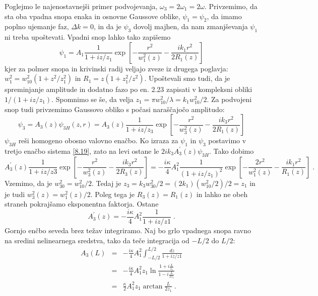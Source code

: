 \documentclass[11pt,fleqn]{book} %
\begin{document}
Poglejmo le najenostavnejši primer podvojevanja, $\omega_{3}=2\omega_{1}=2\omega$.
Privzemimo, da sta oba vpadna snopa enaka in osnovne Gaussove oblike,
$\psi_{1}=\psi_{2}$, da imamo poplno ujemanje faz, $\Delta k=0$,
in da je $\psi_{3}$ dovolj majhen, da nam zmanjševanja $\psi_{1}$
ni treba upoštevati. Vpadni snop lahko tako zapišemo 
\begin{equation}
\psi_{1}=A_{1}\frac{1}{1+iz/z_{1}}\exp[-\frac{r^{2}}{w_{1}^{2}(z)}-\frac{ik_{1}r^{2}}{2R_{1}(z)}]\label{8.21}
\end{equation}
 kjer za polmer snopa in krivinski radij veljajo zveze iz drugega
poglavja: $w_{1}^{2}=w_{10}^{2}(1+z^{2}/z_{1}^{2})$ in $R_{1}=z(1+z_{1}^{2}/z^{2})$.
Upoštevali smo tudi, da je spreminjanje amplitude in dodatno fazo
po en. 2.23 zapisati v kompleksni obliki $1/(1+iz/z_{1})$. Spomnimo
se še, da velja $z_{1}=\pi w_{10}^{2}/\lambda=k_{1}w_{10}^{2}/2$.
Za podvojeni snop tudi privzemimo Gaussovo obliko s počasi naraščajočo
amplitudo: 
\begin{equation}
\psi_{3}=A_{3}(z)\psi_{3H}(z,r)=A_{3}(z)\frac{1}{1+iz/z_{3}}\exp[-\frac{r^{2}}{w_{3}^{2}(z)}-\frac{ik_{3}r^{2}}{2R_{1}(z)}]\label{8.22}
\end{equation}
 $\psi_{3H}$ reši homogeno obosno valovno enačbo. Ko izraza za $\psi_{1}$
in $\psi_{3}$ postavimo v tretjo enačbo sistema \ref{8.19}, zato
na levi ostane le $2ik_{3}A_{3}^{\prime}(z)\psi_{3H}$. Tako dobimo
\begin{equation}
A_{3}^{\prime}(z)\frac{1}{1+iz/z3}\exp[-\frac{r^{2}}{w_{3}^{2}(z)}-\frac{ik_{3}r^{2}}{2R_{3}(z)}]=-\frac{i\kappa}{4}A_{1}^{2}\frac{1}{(1+iz/z_{1})^{2}}\exp[-\frac{2r^{2}}{w_{1}^{2}(z)}-\frac{ik_{1}r^{2}}{R_{1}(z)}]\;.\label{8.23}
\end{equation}
 Vzemimo, da je $w_{30}^{2}=w_{10}^{2}/2$. Tedaj je $z_{3}=k_{3}w_{30}^{2}/2=(2k_{1})(w_{10}^{2}/2)/2=z_{1}$
in je tudi $w_{3}^{2}(z)=w_{1}^{2}(z)/2$. Poleg tega je $R_{3}(z)=R_{1}(z)$
in lahko ne obeh straneh pokrajšamo eksponentna faktorja. Ostane 
\begin{equation}
A_{3}^{\prime}(z)=-\frac{i\kappa}{4}A_{1}^{2}\frac{1}{1+iz/z1}\;.\label{8.24}
\end{equation}
 Gornjo enčbo seveda brez težav integriramo. Naj bo grlo vpadnega
snopa ravno na sredini nelinearnega sredstva, tako da teče integracija
od $-L/2$ do $L/2$: 
\begin{eqnarray}
A_{3}(L) & = & -\frac{i\kappa}{4}A_{1}^{2}\int_{-L/2}^{L/2}\frac{dz}{1+iz/z1}\nonumber \\
 & = & -\frac{i\kappa}{4}A_{1}^{2}z_{1}\ln\frac{1+i\frac{L}{z_{1}}}{1-i\frac{L}{2z_{1}}}\nonumber \\
 & = & \frac{\kappa}{2}A_{1}^{2}z_{1}\arctan\frac{L}{2z_{1}}\;.
\end{eqnarray}
\end{document}
